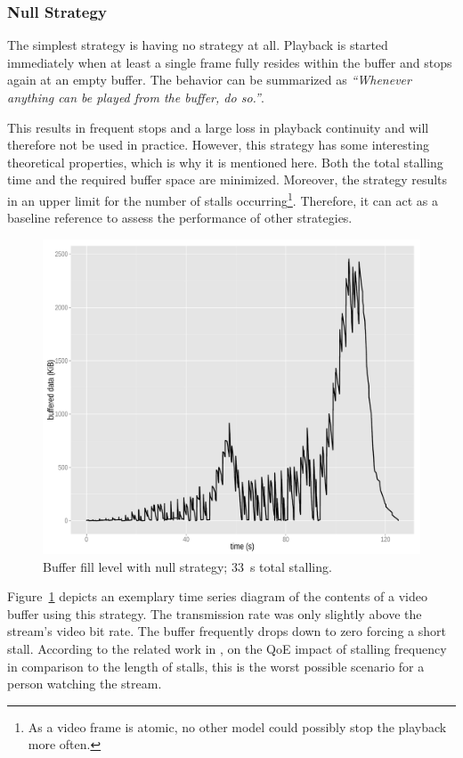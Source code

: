 \subsubsection{Null Strategy}

The simplest strategy is having no strategy at all. Playback is started immediately when at least a single frame fully resides within the buffer and stops again at an empty buffer. The behavior can be summarized as \textit{``Whenever anything can be played from the buffer, do so.''}.

This results in frequent stops and a large loss in playback continuity and will therefore not be used in practice. However, this strategy has some interesting theoretical properties, which is why it is mentioned here. Both the total stalling time and the required buffer space are minimized. Moreover, the strategy results in an upper limit for the number of stalls occurring\footnote{As a video frame is atomic, no other model could possibly stop the playback more often.}. Therefore, it can act as a baseline reference to assess the performance of other strategies.

\begin{figure}[htb]
	\centering
	\includegraphics[width=1.0\textwidth]{images/R-bufferlevel-stall.pdf}
	\caption{Buffer fill level with null strategy; \SI{33}{\second} total stalling.}
\label{c3:fig:bufferlevel-stall}
\end{figure}

Figure~\ref{c3:fig:bufferlevel-stall} depicts an exemplary time series diagram of the contents of a video buffer using this strategy. The transmission rate was only slightly above the stream's video bit rate. The buffer frequently drops down to zero forcing a short stall. According to the related work in \cite{6123395}, on the \gls{QoE} impact of stalling frequency in comparison to the length of stalls, this is the worst possible scenario for a person watching the stream.



